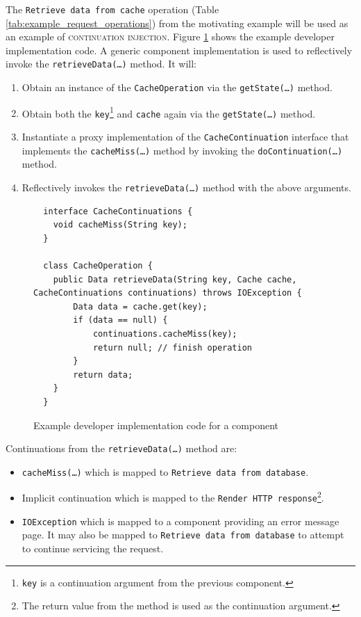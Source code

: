 \documentclass[prodmode]{style/acmlarge}
\begin{document}
The \texttt{Retrieve data from cache} operation (Table
\ref{tab:example_request_operations}) from the motivating example will be used
as an example of \textsc{continuation injection}.  Figure
\ref{fig:Example_Method_Operation} shows the example developer implementation
code.  A generic component implementation is used to reflectively invoke the
\texttt{retrieveData(\ldots)} method. It will:
\begin{enumerate}
  \item Obtain an instance of the \texttt{CacheOperation} via the \texttt{getState(\ldots)} method.
  \item Obtain both the \texttt{key}\footnote{\texttt{key} is a continuation argument from the previous component.} and \texttt{cache} again via the \texttt{getState(\ldots)} method.
  \item Instantiate a proxy implementation of the \texttt{CacheContinuation} interface that implements the \texttt{cacheMiss(\ldots)} method by invoking the \texttt{doContinuation(\ldots)} method. 
  \item Reflectively invokes the \texttt{retrieveData(\ldots)} method with the above arguments.
\end{enumerate}

\begin{figure}[tp]
\centering
\begin{verbatim}
  interface CacheContinuations {
    void cacheMiss(String key);
  }

  class CacheOperation {    
    public Data retrieveData(String key, Cache cache, CacheContinuations continuations) throws IOException {
        Data data = cache.get(key);
        if (data == null) {
            continuations.cacheMiss(key);
            return null; // finish operation
        }
        return data;
    }
  }
\end{verbatim}
\caption{Example developer implementation code for a component\footnotemark}
\label{fig:Example_Method_Operation}
\end{figure}

Continuations from the \texttt{retrieveData(\ldots)} method are:
\begin{itemize}
  \item \texttt{cacheMiss(\ldots)} which is mapped to \texttt{Retrieve data from database}.
  \item Implicit continuation which is mapped to the \texttt{Render HTTP response}\footnote{The return value from the method is used as the continuation argument.}.
  \item \texttt{IOException} which is mapped to a component providing an error message page.  It may also be mapped to \texttt{Retrieve data from database} to attempt to continue servicing the request.
\end{itemize}
\end{document}
